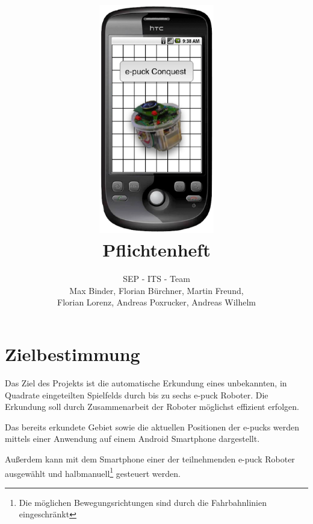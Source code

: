 \documentclass[10pt,a4paper]{article}
\title{
	\includegraphics[height=10cm]{logo.eps} \\
	\vspace{1cm}
	Pflichtenheft
}
\author{SEP - ITS - Team \\ Max Binder, Florian Bürchner, Martin Freund, \\Florian Lorenz,
											Andreas Poxrucker, Andreas Wilhelm}
\let\oldsection\section
\renewcommand{\section}{\newpage \oldsection}
\begin{document}
	\maketitle
	\newpage
	\tableofcontents	
	\newpage
	
	\section{Zielbestimmung}
		Das Ziel des Projekts ist die automatische Erkundung eines unbekannten, in Quadrate eingeteilten Spielfelds durch bis zu
		sechs e-puck Roboter. Die Erkundung soll durch Zusammenarbeit der Roboter möglichst effizient erfolgen.
		
		Das bereits erkundete Gebiet sowie die aktuellen Positionen der e-pucks werden mittels einer Anwendung auf einem Android
		Smartphone dargestellt.	
		
		Außerdem kann mit dem Smartphone einer der teilnehmenden e-puck Roboter ausgewählt und halbmanuell\footnote{Die
			möglichen Bewegungsrichtungen sind durch die Fahrbahnlinien eingeschränkt}  gesteuert werden.
\end{document}
